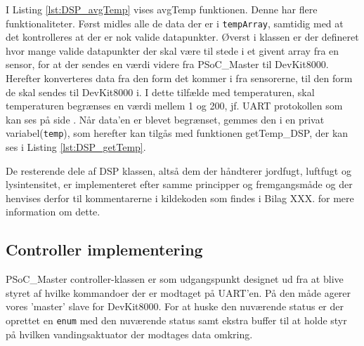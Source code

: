 

I Listing \ref{lst:DSP_avgTemp} vises avgTemp funktionen. Denne har flere funktionaliteter. Først midles alle de data der er i \texttt{tempArray}, samtidig med at det kontrolleres at der er nok valide datapunkter. Øverst i klassen er der defineret hvor mange valide datapunkter der skal være til stede i et givent array fra en sensor, for at der sendes en værdi videre fra PSoC\_Master til DevKit8000. Herefter konverteres data fra den form det kommer i fra sensorerne, til den form de skal sendes til DevKit8000 i. I dette tilfælde med temperaturen, skal temperaturen begrænses en værdi mellem 1 og 200, jf. UART protokollen som kan ses på side \pageref{sec:UART_protokol}. Når data'en er blevet begrænset, gemmes den i en privat variabel(\texttt{temp}), som herefter kan tilgås med funktionen getTemp\_DSP, der kan ses i Listing \ref{lst:DSP_getTemp}.



De resterende dele af DSP klassen, altså dem der håndterer jordfugt, luftfugt og lysintensitet, er implementeret efter samme principper og fremgangsmåde og der henvises derfor til kommentarerne i kildekoden som findes i Bilag XXX. for mere information om dette.
\clearpage

\subsection{Controller implementering} \label{sec:Controller_impl}

PSoC\_Master controller-klassen er som udgangspunkt designet ud fra at blive styret af hvilke kommandoer der er modtaget på UART'en. På den måde agerer vores 'master' slave for DevKit8000. 
For at huske den nuværende status er der oprettet en \texttt{enum} med den nuværende status samt ekstra buffer til at holde styr på hvilken vandingsaktuator der modtages data omkring.



